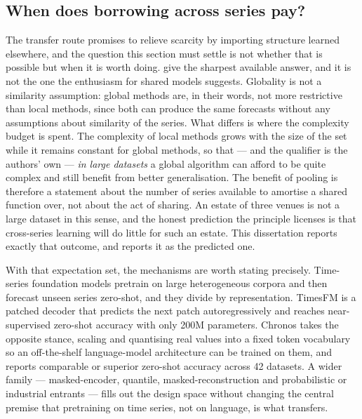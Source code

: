 \subsection*{When does borrowing across series pay?}

The transfer route promises to relieve scarcity by importing structure learned
elsewhere, and the question this section must settle is not whether that is
possible but when it is worth doing. \citet{montero-manso_principles_2021}
give the sharpest available answer, and it is not the one the enthusiasm for
shared models suggests. Globality is not a similarity assumption: global
methods are, in their words, not more restrictive than local methods, since
both can produce the same forecasts without any assumptions about similarity of
the series. What differs is where the complexity budget is spent. The
complexity of local methods grows with the size of the set while it remains
constant for global methods, so that --- and the qualifier is the authors' own
--- \emph{in large datasets} a global algorithm can afford to be quite complex
and still benefit from better generalisation. The benefit of pooling is
therefore a statement about the number of series available to amortise a
shared function over, not about the act of sharing. An estate of three venues
is not a large dataset in this sense, and the honest prediction the principle
licenses is that cross-series learning will do little for such an estate. This
dissertation reports exactly that outcome, and reports it as the predicted one.

With that expectation set, the mechanisms are worth stating precisely.
Time-series foundation models pretrain on large heterogeneous corpora and then
forecast unseen series zero-shot, and they divide by representation. TimesFM
\citep{das_decoder-only_2024} is a patched decoder that predicts the next patch
autoregressively and reaches near-supervised zero-shot accuracy with only 200M
parameters. Chronos \citep{ansari_chronos_2024} takes the opposite stance,
scaling and quantising real values into a fixed token vocabulary so an
off-the-shelf language-model architecture can be trained on them, and reports
comparable or superior zero-shot accuracy across 42 datasets. A wider family
--- masked-encoder, quantile, masked-reconstruction and probabilistic or
industrial entrants
\citep{woo_unified_2024,liu_moirai_2026,goswami_moment_2024,rasul_lag-llama_2024,garza_timegpt-1_2024}
--- fills out the design space without changing the central premise that
pretraining on time series, not on language, is what transfers.

